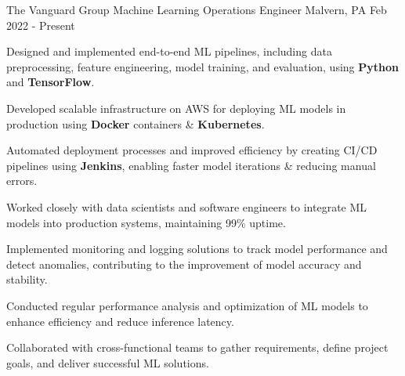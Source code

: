 


\begin{cventries}

\cventry
{The Vanguard Group} %
{Machine Learning Operations Engineer} %
{Malvern, PA} %
{Feb 2022 - Present} %
{ %
\begin{cvitems}
\item Designed and implemented end-to-end ML pipelines, including data preprocessing, feature engineering, model training, and evaluation, using \textbf{Python} and \textbf{TensorFlow}.
\item Developed scalable infrastructure on AWS for deploying ML models in production using \textbf{Docker} containers \& \textbf{Kubernetes}.
\item Automated deployment processes and improved efficiency by creating CI/CD pipelines using \textbf{Jenkins}, enabling faster model iterations \& reducing manual errors.
\item Worked closely with data scientists and software engineers to integrate ML models into production systems, maintaining 99\% uptime.
\item Implemented monitoring and logging solutions to track model performance and detect anomalies, contributing to the improvement of model accuracy and stability.
\item Conducted regular performance analysis and optimization of ML models to enhance efficiency and reduce inference latency.
\item Collaborated with cross-functional teams to gather requirements, define project goals, and deliver successful ML solutions.
\end{cvitems}
}


\end{cventries}
